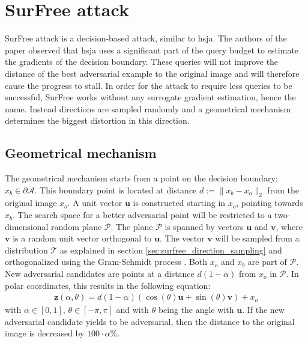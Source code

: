 \section{SurFree attack}
SurFree attack \cite{surfree} is a decision-based attack, similar to \gls{hsja}. The authors of the paper observed that \gls{hsja} uses a significant part of the query budget to estimate the gradients of the decision boundary. These queries will not improve the distance of the best adversarial example to the original image and will therefore cause the progress to stall. In order for the attack to require less queries to be successful, SurFree works without any surrogate gradient estimation, hence the name. Instead directions are sampled randomly and a geometrical mechanism determines the biggest distortion in this direction.\\

\subsection{Geometrical mechanism}\label{subsec:geometrical}
The geometrical mechanism starts from a point on the decision boundary: $x_b \in \partial\mathcal{A}$. This boundary point is located at distance $d := \| x_b - x_o\|_2 $ from the original image $x_o$. A unit vector $\mathbf{u}$ is constructed starting in $x_o$, pointing towards $x_b$. The search space for a better adversarial point will be restricted to a two-dimensional random plane $\mathcal{P}$. The plane $\mathcal{P}$ is spanned by vectors $\mathbf{u}$ and $\mathbf{v}$, where $\mathbf{v}$ is a random unit vector orthogonal to $\mathbf{u}$. The vector $\mathbf{v}$ will be sampled from a distribution $\mathcal{T}$ as explained in section \ref{sec:surfree_direction_sampling} and orthogonalized using the Gram-Schmidt process \cite{gram_schmidt}. Both $x_o$ and $x_b$ are part of $\mathcal{P}$.\\

New adversarial candidates are points at a distance $d(1 - \alpha)$ from $x_o$ in $\mathcal{P}$. In polar coordinates, this results in the following equation:
\begin{align}
 \mathbf{z}(\alpha, \theta) = d(1-\alpha) (\cos(\theta)\mathbf{u} + \sin(\theta)\mathbf{v}) + x_o \label{eq:surfree_polar}
\end{align}
with $\alpha \in [0,1]$, $\theta \in [-\pi, \pi]$ and with $\theta$ being the angle with $\mathbf{u}$. If the new adversarial candidate yields to be adversarial, then the distance to the original image is decreased by $100\cdot\alpha \%$.\\

